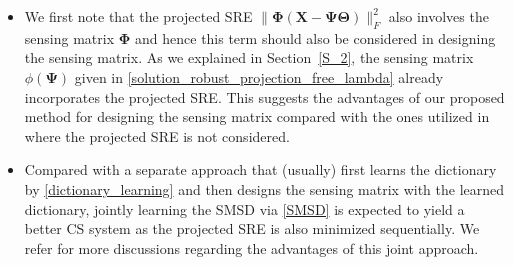 \documentclass[final,5p,times,twocolumn]{elsarticle}
\begin{document}
{
\vspace{-0.25cm}
\begin{itemize}
\item We first note that the projected SRE $\|\bm \Phi (\bm X - \bm \Psi \bm \Theta)\|_F^2$ also involves the sensing matrix $\bm \Phi$ and hence this term should also be considered in designing the sensing matrix. As we explained in Section~\ref{S_2}, the sensing matrix $\phi(\bm \Psi)$ given in \eqref{solution_robust_projection_free_lambda} already incorporates the projected SRE. This suggests the advantages of our proposed method for designing the sensing matrix compared with the ones utilized in \cite{DCS09,BLLLJC15} where the projected SRE is not considered.
\vspace{-0.25cm}
\item Compared with a separate approach that (usually) first learns the dictionary by \eqref{dictionary_learning} and then designs the sensing matrix with the learned dictionary, jointly learning the SMSD via \eqref{SMSD} is expected to yield a better CS system as the projected SRE is also minimized sequentially. We refer \cite{DCS09,BLLLJC15} for more discussions regarding the advantages of this joint approach.
\end{itemize}
\vspace{-0.25cm}

}
\end{document}
